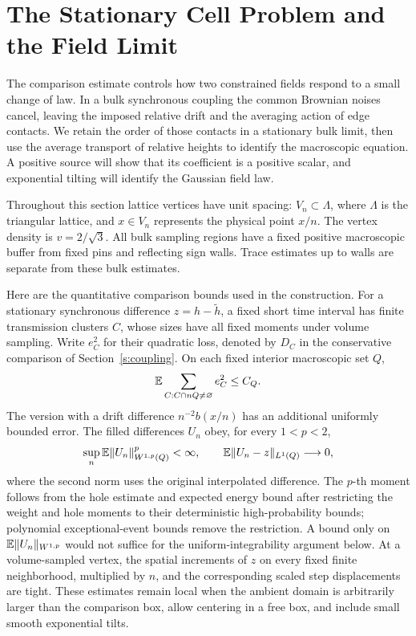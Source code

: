 \section{The Stationary Cell Problem and the Field Limit}
\label{sec:cell}

The comparison estimate controls how two constrained fields respond to a
small change of law. In a bulk synchronous coupling the common Brownian noises
cancel, leaving the imposed relative drift and the averaging action of
edge contacts. We retain the order of those contacts in a stationary bulk
limit, then use the average transport of relative heights to identify the
macroscopic equation. A positive source will show that its coefficient
is a positive scalar, and exponential tilting will identify the Gaussian
field law.

Throughout this section lattice vertices have unit spacing:
$V_n\subset\Lambda$, where $\Lambda$ is the triangular lattice, and
$x\in V_n$ represents the physical point $x/n$. The vertex density is
$v=2/\sqrt3$. All bulk sampling regions have a fixed positive
macroscopic buffer from fixed pins and reflecting sign walls. Trace
estimates up to walls are separate from these bulk estimates.

Here are the quantitative comparison bounds used in the construction.
For a stationary synchronous difference $z=h-\widetilde h$, a fixed
short time interval has finite transmission clusters $C$, whose sizes
have all fixed moments under volume sampling. Write $e_C^2$ for their
quadratic loss, denoted by $D_C$ in the conservative comparison of
Section~\ref{s:coupling}. On each fixed interior macroscopic set $Q$,
\begin{equation}\label{b:energy-input}
 \mathbb E\sum_{C:C\cap nQ\ne\varnothing}e_C^2\le C_Q.
\end{equation}
The version with a drift difference $n^{-2}b(x/n)$ has an additional
uniformly bounded error. The filled differences $U_n$ obey, for every
$1<p<2$,
\[
 \sup_n\mathbb E\|U_n\|_{W^{1,p}(Q)}^p<\infty,
 \qquad
 \mathbb E\|U_n-z\|_{L^1(Q)}\longrightarrow0,
\]
where the second norm uses the original interpolated difference.
The $p$-th moment follows from the hole estimate and expected energy
bound after restricting the weight and hole moments to their
deterministic high-probability bounds; polynomial exceptional-event
bounds remove the restriction. A bound only on
$\mathbb E\|U_n\|_{W^{1,p}}$ would not suffice for the uniform-integrability
argument below. At a volume-sampled vertex, the spatial increments of
$z$ on every fixed finite neighborhood, multiplied by $n$, and the
corresponding scaled step displacements are tight. These estimates
remain local when the ambient domain is arbitrarily larger than the
comparison box, allow centering in a free box, and include small smooth
exponential tilts.

